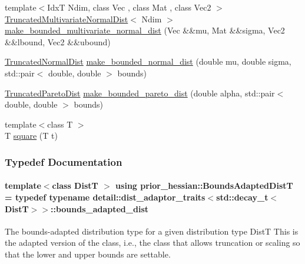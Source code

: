 \begin{DoxyCompactItemize}
\item 
{\footnotesize template$<$IdxT Ndim, class Vec , class Mat , class Vec2 $>$ }\\\hyperlink{namespaceprior__hessian_a99ef03c8a3e476931d451d6d944ffae5}{Truncated\+Multivariate\+Normal\+Dist}$<$ Ndim $>$ \hyperlink{namespaceprior__hessian_a51a85cfe6ac613ed9b703e10280c1bbb}{make\+\_\+bounded\+\_\+multivariate\+\_\+normal\+\_\+dist} (Vec \&\&mu, Mat \&\&sigma, Vec2 \&\&lbound, Vec2 \&\&ubound)
\item 
\hyperlink{namespaceprior__hessian_a47f38d4bb5d31fd3f01f5eb6ba6f1223}{Truncated\+Normal\+Dist} \hyperlink{namespaceprior__hessian_a14ebf8db869f2c1e45781e41e69b3420}{make\+\_\+bounded\+\_\+normal\+\_\+dist} (double mu, double sigma, std\+::pair$<$ double, double $>$ bounds)
\item 
\hyperlink{namespaceprior__hessian_afebdccc7e1a35836f660f8a301af9cb2}{Truncated\+Pareto\+Dist} \hyperlink{namespaceprior__hessian_ae6d920b436127ce4698e75575581eed5}{make\+\_\+bounded\+\_\+pareto\+\_\+dist} (double alpha, std\+::pair$<$ double, double $>$ bounds)
\item 
{\footnotesize template$<$class T $>$ }\\T \hyperlink{namespaceprior__hessian_a706cb136b90f16dd920118eb59ef1ad6}{square} (T t)
\end{DoxyCompactItemize}


\subsubsection{Typedef Documentation}
\paragraph[{\texorpdfstring{Bounds\+Adapted\+DistT}{BoundsAdaptedDistT}}]{\setlength{\rightskip}{0pt plus 5cm}template$<$class DistT $>$ using {\bf prior\+\_\+hessian\+::\+Bounds\+Adapted\+DistT} = typedef typename {\bf detail\+::dist\+\_\+adaptor\+\_\+traits}$<$std\+::decay\+\_\+t$<$DistT$>$$>$\+::bounds\+\_\+adapted\+\_\+dist}\hypertarget{namespaceprior__hessian_a919f0d7f51ea845224ca7f03983508a9}{}\label{namespaceprior__hessian_a919f0d7f51ea845224ca7f03983508a9}
The bounds-\/adapted distribution type for a given distribution type DistT This is the adapted version of the class, i.\+e., the class that allows truncation or scaling so that the lower and upper bounds are settable. 

